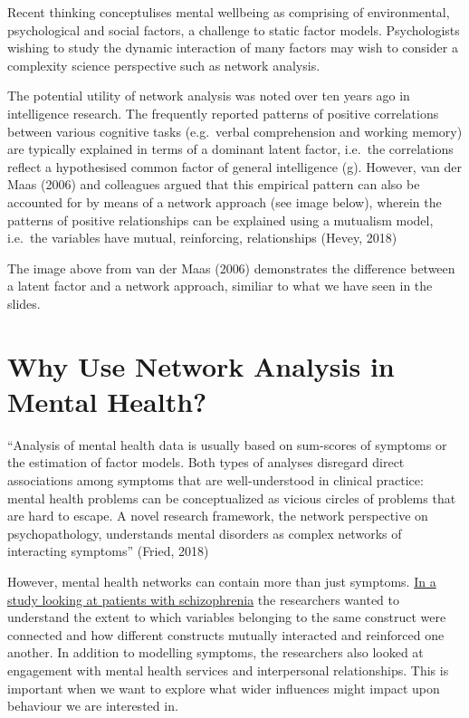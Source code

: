 \documentclass[]{book}
\begin{document}
Recent thinking conceptulises mental wellbeing as comprising of environmental, psychological and social factors, a challenge to static factor models. Psychologists wishing to study the dynamic interaction of many factors may wish to consider a complexity science perspective such as network analysis.

The potential utility of network analysis was noted over ten years ago in intelligence research. The frequently reported patterns of positive correlations between various cognitive tasks (e.g.~verbal comprehension and working memory) are typically explained in terms of a dominant latent factor, i.e.~the correlations reflect a hypothesised common factor of general intelligence (g). However, van der Maas (2006) and colleagues argued that this empirical pattern can also be accounted for by means of a network approach (see image below), wherein the patterns of positive relationships can be explained using a mutualism model, i.e.~the variables have mutual, reinforcing, relationships (Hevey, 2018)

The image above from van der Maas (2006) demonstrates the difference between a latent factor and a network approach, similiar to what we have seen in the slides.

\hypertarget{why-use-network-analysis-in-mental-health}{%
\section{Why Use Network Analysis in Mental Health?}\label{why-use-network-analysis-in-mental-health}}

``Analysis of mental health data is usually based on sum-scores of symptoms or the estimation of factor models. Both types of analyses disregard direct associations among symptoms that are well-understood in clinical practice: mental health problems can be conceptualized as vicious circles of problems that are hard to escape. A novel research framework, the network perspective on psychopathology, understands mental disorders as complex networks of interacting symptoms'' (Fried, 2018)

However, mental health networks can contain more than just symptoms. \href{https://jamanetwork.com/journals/jamapsychiatry/fullarticle/2671414?casa_token=nGUSw-yIg1YAAAAA\%3aXJz4Ehq44lBBE3iDqQhuNSGgJfafMX9lGyiDx9YxHJpVSFVOJo0gkA0NdrEGhY9T-6mvlB17}{In a study looking at patients with schizophrenia} the researchers wanted to understand the extent to which variables belonging to the same construct were connected and how different constructs mutually interacted and reinforced one another. In addition to modelling symptoms, the researchers also looked at engagement with mental health services and interpersonal relationships. This is important when we want to explore what wider influences might impact upon behaviour we are interested in.
\end{document}
